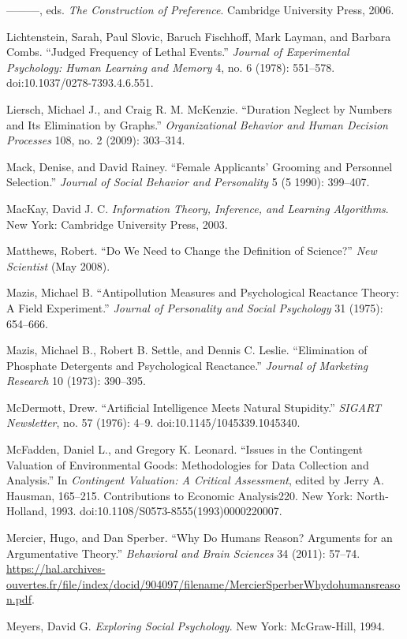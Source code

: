 {
 {}---{}---{}---, eds. \textit{The Construction of Preference}.
Cambridge University Press, 2006.}

{
 Lichtenstein, Sarah, Paul Slovic, Baruch Fischhoff, Mark Layman,
and Barbara Combs. ``Judged Frequency of Lethal
Events.'' \textit{Journal of Experimental Psychology:
Human Learning and Memory} 4, no. 6 (1978): 551--578.
doi:10.1037/0278-7393.4.6.551.}

{
 Liersch, Michael J., and Craig R. M. McKenzie.
``Duration Neglect by Numbers and Its Elimination by
Graphs.'' \textit{Organizational Behavior and Human
Decision Processes} 108, no. 2 (2009): 303--314.}

{
 Mack, Denise, and David Rainey. ``Female
Applicants' Grooming and Personnel
Selection.'' \textit{Journal of Social Behavior and
Personality} 5 (5 1990): 399--407.}

{
 MacKay, David J. C. \textit{Information Theory, Inference, and
Learning Algorithms}. New York: Cambridge University Press, 2003.}

{
 Matthews, Robert. ``Do We Need to Change the
Definition of Science?'' \textit{New Scientist} (May
2008).}

{
 Mazis, Michael B. ``Antipollution Measures and
Psychological Reactance Theory: A Field Experiment.''
\textit{Journal of Personality and Social Psychology} 31 (1975):
654--666.}

{
 Mazis, Michael B., Robert B. Settle, and Dennis C. Leslie.
``Elimination of Phosphate Detergents and
Psychological Reactance.'' \textit{Journal of
Marketing Research} 10 (1973): 390--395.}

{
 McDermott, Drew. ``Artificial Intelligence Meets
Natural Stupidity.'' \textit{SIGART Newsletter}, no.
57 (1976): 4--9. doi:10.1145/1045339.1045340.}

{
 McFadden, Daniel L., and Gregory K. Leonard.
``Issues in the Contingent Valuation of Environmental
Goods: Methodologies for Data Collection and
Analysis.'' In \textit{Contingent Valuation: A
Critical Assessment}, edited by Jerry A. Hausman, 165--215.
Contributions to Economic Analysis220. New York: North-Holland, 1993.
doi:10.1108/S0573-8555(1993)0000220007.}

{
 Mercier, Hugo, and Dan Sperber. ``Why Do Humans
Reason? Arguments for an Argumentative Theory.''
\textit{Behavioral and Brain Sciences} 34 (2011): 57--74.
\url{https://hal.archives-ouvertes.fr/file/index/docid/904097/filename/MercierSperberWhydohumansreason.pdf}.}

{
 Meyers, David G. \textit{Exploring Social Psychology}. New York:
McGraw-Hill, 1994.}

